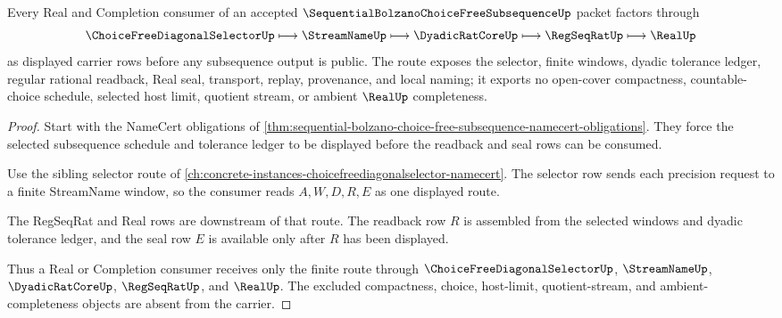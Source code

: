 \begin{theorem}
\label{thm:sequential-bolzano-choice-free-subsequence-real-route}
Every Real and Completion consumer of an accepted $\SequentialBolzanoChoiceFreeSubsequenceUp$ packet factors through
$$
\ChoiceFreeDiagonalSelectorUp\longmapsto\StreamNameUp\longmapsto\DyadicRatCoreUp\longmapsto\RegSeqRatUp\longmapsto\RealUp
$$
as displayed carrier rows before any subsequence output is public. The route exposes the selector, finite windows, dyadic tolerance ledger, regular rational readback, Real seal, transport, replay, provenance, and local naming; it exports no open-cover compactness, countable-choice schedule, selected host limit, quotient stream, or ambient $\RealUp$ completeness.
\end{theorem}
\begin{proof}
Start with the NameCert obligations of \autoref{thm:sequential-bolzano-choice-free-subsequence-namecert-obligations}. They force the selected subsequence schedule and tolerance ledger to be displayed before the readback and seal rows can be consumed.

Use the sibling selector route of \autoref{ch:concrete-instances-choicefreediagonalselector-namecert}. The selector row sends each precision request to a finite StreamName window, so the consumer reads $A,W,D,R,E$ as one displayed route.

The RegSeqRat and Real rows are downstream of that route. The readback row $R$ is assembled from the selected windows and dyadic tolerance ledger, and the seal row $E$ is available only after $R$ has been displayed.

Thus a Real or Completion consumer receives only the finite route through $\ChoiceFreeDiagonalSelectorUp$, $\StreamNameUp$, $\DyadicRatCoreUp$, $\RegSeqRatUp$, and $\RealUp$. The excluded compactness, choice, host-limit, quotient-stream, and ambient-completeness objects are absent from the carrier.
\end{proof}


